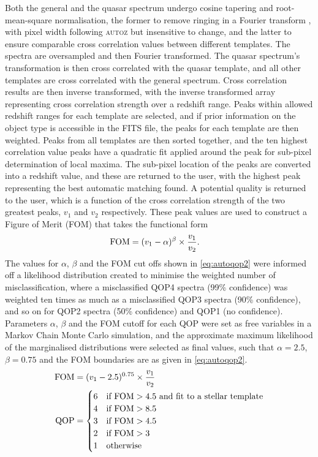 \documentclass[iop]{emulateapj}
\newcommand{\autoz}{\textsc{autoz}}
\begin{document}
Both the general and the quasar spectrum undergo cosine tapering and root-mean-square normalisation, the former to remove ringing in a Fourier transform \citep[apodization;][]{kurtz1998rvsao}, with pixel width following \autoz{} but insensitive to change, and the latter to ensure comparable cross correlation values between different templates. The spectra are oversampled and then Fourier transformed. The quasar spectrum's transformation is then cross correlated with the quasar template, and all other templates are cross correlated with the general spectrum. Cross correlation results are then inverse transformed, with the inverse transformed array representing cross correlation strength over a redshift range. Peaks within allowed redshift ranges for each template are selected, and if prior information on the object type is accessible in the FITS file, the peaks for each template are then weighted. Peaks from all templates are then sorted together, and the ten highest correlation value peaks have a quadratic fit applied around the peak for sub-pixel determination of local maxima. The sub-pixel location of the peaks are converted into a redshift value, and these are returned to the user, with the highest peak representing the best automatic matching found. A potential quality is returned to the user, which is a function of the cross correlation strength of the two greatest peaks, $v_1$ and $v_2$ respectively. These peak values are used to construct a Figure of Merit (FOM) that takes the functional form
\begin{align}
{\rm FOM} &= (v_1-\alpha)^{\beta} \times \frac{v_1}{v_2}. \label{eq:autoqop}
\end{align}
The values for $\alpha$, $\beta$ and the FOM cut offs shown in \eqref{eq:autoqop2} were informed off a likelihood distribution created to minimise the weighted number of misclassification, where a misclassified QOP4 spectra (99\% confidence) was weighted ten times as much as a misclassified QOP3 spectra (90\% confidence), and so on for QOP2 spectra (50\% confidence) and QOP1 (no confidence). Parameters $\alpha$, $\beta$ and the FOM cutoff for each QOP were set as free variables in a Markov Chain Monte Carlo simulation, and the approximate maximum likelihood of the marginalised distributions were selected as final values, such that $\alpha = 2.5$, $\beta = 0.75$ and the FOM boundaries are as given in \eqref{eq:autoqop2}.
\begin{align}
{\rm FOM} &= (v_1-2.5)^{0.75} \times \frac{v_1}{v_2} \label{eq:autoqop3}\\
{\rm QOP} &= \begin{cases}6 & \text{if } {\rm FOM} > 4.5 \text{ and fit to a stellar template} \label{eq:autoqop2}\\
4 & \text{if } {\rm FOM} > 8.5  \\
3 & \text{if } {\rm FOM} > 4.5 \\
2 & \text{if } {\rm FOM} > 3 \\
1 & \text{otherwise} \end{cases}
\end{align}
\end{document}
